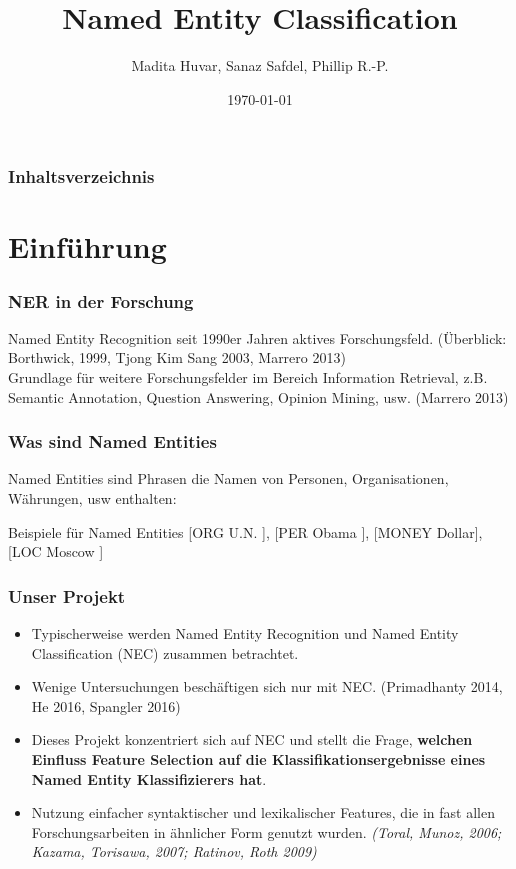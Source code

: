 \documentclass{beamer}
\title{Named Entity Classification}
\author{Madita Huvar, Sanaz Safdel, Phillip R.-P.}
\date{\today}
\begin{document}
\begin{frame}
\titlepage
\end{frame} 

\begin{frame}
\frametitle{Inhaltsverzeichnis}
\tableofcontents
\end{frame} 


\section{Einführung}
\begin{frame}
	\frametitle{NER in der Forschung}
	Named Entity Recognition seit 1990er Jahren aktives Forschungsfeld. (Überblick: Borthwick, 1999, Tjong Kim Sang 2003, Marrero 2013)\\
	
	Grundlage für weitere Forschungsfelder im Bereich Information Retrieval, z.B. Semantic Annotation, Question Answering, Opinion Mining, usw. (Marrero 2013)
\end{frame}
\begin{frame}
	\frametitle{Was sind Named Entities}
	Named Entities sind Phrasen die Namen von Personen, Organisationen, Währungen, usw enthalten:\\
	\begin{exampleblock}{Beispiele für Named Entities}
		[ORG U.N. ], [PER Obama ], [MONEY Dollar], [LOC Moscow ] 
	\end{exampleblock}

\end{frame}
	\begin{frame}
		\frametitle{Unser Projekt}
		\begin{itemize}
			\item <+->Typischerweise werden Named Entity Recognition und Named Entity Classification (NEC) zusammen betrachtet.
			\item <+->Wenige Untersuchungen beschäftigen sich nur mit NEC. (Primadhanty 2014, He 2016, Spangler 2016)
			\item <+->Dieses Projekt konzentriert sich auf NEC und stellt die Frage, \textbf{welchen Einfluss Feature Selection auf die Klassifikationsergebnisse eines Named Entity Klassifizierers hat}.
			\item <+->Nutzung einfacher syntaktischer und lexikalischer Features, die in fast allen Forschungsarbeiten in ähnlicher Form genutzt wurden. \textit{(Toral, Munoz, 2006; Kazama, Torisawa, 2007; Ratinov, Roth 2009)} 
		\end{itemize}	

	\end{frame}
\end{document}

